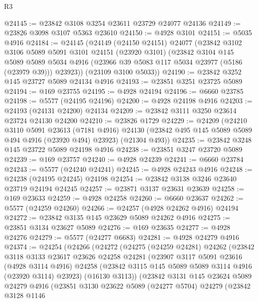 \begin{lexlean}{R3}
\begin{coremodule}
@24145 := @23842 @3108 @3254 @23611 @23729 @24077 @24136
@24149 := @23826 @3098 @3107 @5363 @23610
@24150 := @4928 @3101
@24151 := @5035 @4916
@24184 := @24145
    (@24149
      (@24150 @24151)
      @24077
      (@23842
        @3102
        @3106
        @5089
        @5091
        @3101
        @24151
        (@23920 @3101)
        (@23842
          @3104
          @145
          @5089
          @5089
          @5034
          @4916
          (@23966 @39 @5083 @117 @5034 @23977 (@5186 (@23979 @39)))
          @23923))
      (@23109 @3100 @5033))
@24190 := @23842 @3252 @145 @23727 @5089 @24134 @4916
@24193 := @23851 @3251 @23725 @5089
@24194 := @169 @23755
@24195 := @4928 @24194
@24196 := @6660 @23785
@24198 := @5577 (@24195 @24196)
@24200 := @4928 @24198 @4916
@24203 := @24193 (@24131 @24200) @24134
@24209 := @23842 @3111 @3250 @23614 @23724 @24130 @24200
@24210 := @23826 @1729
@24229 := @24209
    (@24210
      @3110
      @5091
      @23613
      (@7181 @4916)
      @24130
      (@23842 @495 @145 @5089 @5089 @494 @4916 (@23920 @494) @23923)
      (@21304 @493))
@24235 := @23842 @3248 @145 @23722 @5089 @24198 @4916
@24238 := @23851 @3247 @23720 @5089
@24239 := @169 @23757
@24240 := @4928 @24239
@24241 := @6660 @23784
@24243 := @5577 (@24240 @24241)
@24245 := @4928 @24243 @4916
@24248 := @24238 (@24195 @24245) @24198
@24254 := @23842 @3138 @3246 @23640 @23719 @24194 @24245
@24257 := @23871 @3137 @23631 @23639
@24258 := @169 @23633
@24259 := @4928 @24258
@24260 := @6660 @23637
@24262 := @5577 (@24259 @24260)
@24266 := @24257 (@4928 @24262 @4916) @24194
@24272 := @23842 @3135 @145 @23629 @5089 @24262 @4916
@24275 := @23851 @3134 @23627 @5089
@24276 := @169 @23635
@24277 := @4928 @24276
@24279 := @5577 (@24277 @6683)
@24281 := @4928 @24279 @4916
@24374 := @24254
    (@24266
      (@24272
        (@24275
          (@24259 @24281)
          @24262
          (@23842
            @3118
            @3133
            @23617
            @23626
            @24258
            @24281
            (@23907
              @3117
              @5091
              @23616
              (@4928 @3114 @4916)
              @24258
              (@23842 @3115 @145 @5089 @5089 @3114 @4916 (@23920 @3114) @23923)
              (@16130 @3113))
            (@23842
              @3131
              @145
              @23624
              @5089
              @24279
              @4916
              (@23851
                @3130
                @23622
                @5089
                (@24277 @5704)
                @24279
                (@23842
                  @3128
                  @1146

\end{coremodule}
\end{lexlean}
